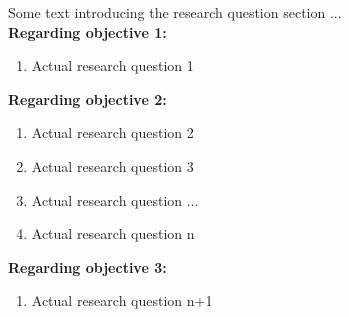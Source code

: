

Some text introducing the research question section ... \\


\noindent
\textbf{Regarding objective 1:}
\begin{enumerate}[left=0pt, label={Question \arabic*:}, align=left, labelsep=1em]

    \item Actual research question 1
\end{enumerate}
\textbf{Regarding objective 2:}
\begin{enumerate}[resume, left=0pt, label={Question \arabic*:}, align=left, labelsep=1em]
    
    \item Actual research question 2
    
    \item Actual research question 3

    \item Actual research question ...

    \item Actual research question n

\end{enumerate}
\textbf{Regarding objective 3:}
\begin{enumerate}[resume, left=0pt, label={Question \arabic*:}, align=left, labelsep=1em]
    
    \item Actual research question n+1

\end{enumerate}




\newpage